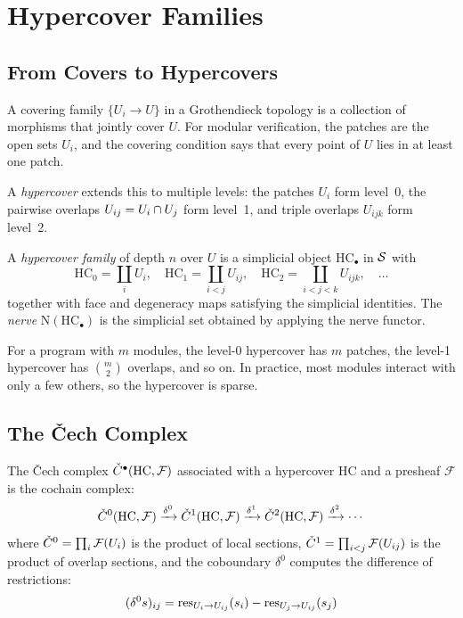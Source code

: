 \documentclass[11pt]{article}
\newcommand{\HC}{\mathrm{HC}}
\newcommand{\Nerve}{\mathrm{N}}
\newcommand{\Sect}{\mathcal{F}}             %
\begin{document}
\section{Hypercover Families}\label{sec:hypercover}

\subsection{From Covers to Hypercovers}

A covering family $\{U_i \to U\}$ in a Grothendieck topology is a
collection of morphisms that jointly cover $U$.  For modular
verification, the patches are the open sets $U_i$, and the covering
condition says that every point of $U$ lies in at least one patch.

A \emph{hypercover} extends this to multiple levels: the patches $U_i$
form level~0, the pairwise overlaps $U_{ij} = U_i \cap U_j$
form level~1, and triple overlaps $U_{ijk}$ form level~2.

\begin{definition}\label{def:hypercover}
A \emph{hypercover family} of depth $n$ over $U$ is a simplicial
object $\HC_\bullet$ in $\mathcal{S}$ with
\[
  \HC_0 = \coprod_i U_i, \quad
  \HC_1 = \coprod_{i < j} U_{ij}, \quad
  \HC_2 = \coprod_{i < j < k} U_{ijk}, \quad \ldots
\]
together with face and degeneracy maps satisfying the simplicial
identities.  The \emph{nerve} $\Nerve(\HC_\bullet)$ is the
simplicial set obtained by applying the nerve functor.
\end{definition}

For a program with $m$ modules, the level-0 hypercover has $m$
patches, the level-1 hypercover has $\binom{m}{2}$ overlaps, and
so on.  In practice, most modules interact with only a few others,
so the hypercover is sparse.

\subsection{The \v{C}ech Complex}

The \v{C}ech complex $\Cech^\bullet(\HC, \Sect)$ associated with a
hypercover $\HC$ and a presheaf $\Sect$ is the cochain complex:
\[
  \Cech^0(\HC, \Sect) \xrightarrow{\delta^0}
  \Cech^1(\HC, \Sect) \xrightarrow{\delta^1}
  \Cech^2(\HC, \Sect) \xrightarrow{\delta^2} \cdots
\]
where $\Cech^0 = \prod_i \Sect(U_i)$ is the product of local
sections, $\Cech^1 = \prod_{i<j} \Sect(U_{ij})$ is the product
of overlap sections, and the coboundary $\delta^0$ computes the
difference of restrictions:
\[
  (\delta^0 s)_{ij} = \mathrm{res}_{U_i \to U_{ij}}(s_i) -
                      \mathrm{res}_{U_j \to U_{ij}}(s_j)
\]
\end{document}
